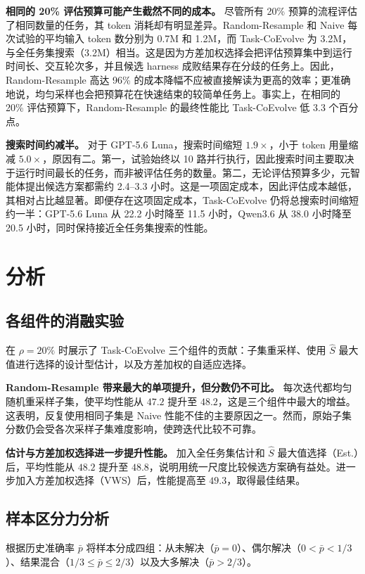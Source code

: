 \documentclass{article}
\begin{document}
\textbf{相同的 20\% 评估预算可能产生截然不同的成本。}
尽管所有 20\% 预算的流程评估了相同数量的任务，其 token 消耗却有明显差异。Random-Resample 和 Naive 每次试验的平均输入 token 数分别为 0.7M 和 1.2M，而 Task-CoEvolve 为 3.2M，与全任务集搜索（3.2M）相当。这是因为方差加权选择会把评估预算集中到运行时间长、交互轮次多，并且候选 harness 成败结果存在分歧的任务上。因此，Random-Resample 高达 96\% 的成本降幅不应被直接解读为更高的效率；更准确地说，均匀采样也会把预算花在快速结束的较简单任务上。事实上，在相同的 20\% 评估预算下，Random-Resample 的最终性能比 Task-CoEvolve 低 3.3 个百分点。

\textbf{搜索时间约减半。}
对于 GPT-5.6 Luna，搜索时间缩短 $1.9\times$，小于 token 用量缩减 $5.0\times$，原因有二。第一，试验始终以 10 路并行执行，因此搜索时间主要取决于运行时间最长的任务，而非被评估任务的数量。第二，无论评估预算多少，元智能体提出候选方案都需约 2.4--3.3 小时。这是一项固定成本，因此评估成本越低，其相对占比越显著。即便存在这项固定成本，Task-CoEvolve 仍将总搜索时间缩短约一半：GPT-5.6 Luna 从 22.2 小时降至 11.5 小时，Qwen3.6 从 38.0 小时降至 20.5 小时，同时保持接近全任务集搜索的性能。

\section{分析}
\subsection{各组件的消融实验}
\label{subsec:ablation}

 在 $\rho{=}20\%$ 时展示了 Task-CoEvolve 三个组件的贡献：子集重采样、使用 $\hat{S}$ 最大值进行选择的设计型估计，以及方差加权的自适应选择。

\textbf{Random-Resample 带来最大的单项提升，但分数仍不可比。}
每次迭代都均匀随机重采样子集，使平均性能从 $47.2$ 提升至 $48.2$，这是三个组件中最大的增益。这表明，反复使用相同子集是 Naive 性能不佳的主要原因之一。然而，原始子集分数仍会受各次采样子集难度影响，使跨迭代比较不可靠。

\textbf{估计与方差加权选择进一步提升性能。}
加入全任务集估计和 $\hat{S}$ 最大值选择（Est.）后，平均性能从 $48.2$ 提升至 $48.8$，说明用统一尺度比较候选方案确有益处。进一步加入方差加权选择（VWS）后，性能提高至 $49.3$，取得最佳结果。

\subsection{样本区分力分析}
\label{subsec:difficulty}
 根据历史准确率 $\bar{p}$ 将样本分成四组：从未解决（$\bar{p}=0$）、偶尔解决（$0<\bar{p}<1/3$）、结果混合（$1/3 \leq \bar{p} \leq 2/3$）以及大多解决（$\bar{p}>2/3$）。

\end{document}
